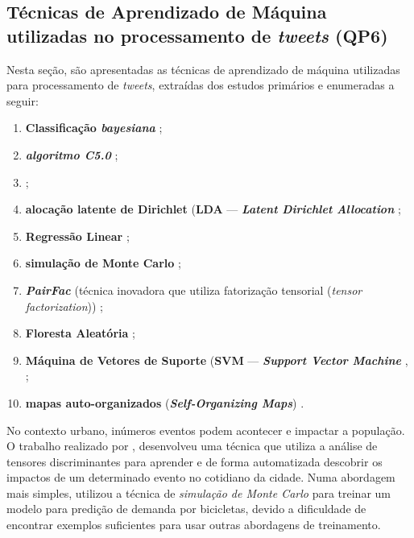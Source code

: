 \documentclass[
	12pt,				%
	oneside,			%
	a4paper,			%
	english,			%
	brazil				%
	]{abntex2ppgsi}
\begin{document}
{{{\begin{enumerate}
\end{enumerate}

\subsection{Técnicas de Aprendizado de Máquina utilizadas no processamento de \textit{tweets} (QP6)}
\label{iaClassification}
Nesta seção, são apresentadas as técnicas de aprendizado de máquina utilizadas para processamento de \textit{tweets}, extraídas dos estudos primários e enumeradas a seguir:

\begin{enumerate}
\item \textbf{Classificação \textit{bayesiana}} \cite{Mata2015};
\item \textit{\textbf{algoritmo C5.0}} \cite{Zagal2016};
\item {} \cite{Anantharam2015};
\item {} \textbf{alocação latente de Dirichlet}  {(\textbf{LDA} --- \textbf{\textit{Latent Dirichlet Allocation}}} \cite{Farseev2015, Abbasi2015, Hasan2014, DiLorenzo2013, Ni2016};
\item \textbf{Regressão Linear} \cite{Gutev2016, Bendler2014, Ni2016, Guo2016};
\item \textbf{simulação de Monte Carlo} \cite{Chen2016};
\item \textbf{\textit{PairFac}} (técnica inovadora que utiliza fatorização tensorial (\textit{tensor factorization})) \cite{Wen2016};
\item \textbf{Floresta Aleatória} \cite{Farseev2015};
\item {} {\textbf{Máquina de Vetores de Suporte} (\textbf{SVM} --- \textit{\textbf{Support Vector Machine}}} \cite{Mukherjee2015}, \cite{Gal-Tzur2014};
\item \textbf{mapas auto-organizados} (\textit{\textbf{Self-Organizing Maps}}) \cite{Frias-Martinez2014}.
\end{enumerate}

No contexto urbano, inúmeros eventos podem acontecer e impactar a população. O trabalho realizado por \cite{Wen2016}, desenvolveu uma técnica que utiliza a análise de tensores discriminantes para aprender e de forma automatizada descobrir os impactos de um determinado evento no cotidiano da cidade. Numa abordagem mais simples, \cite{Chen2016} utilizou a técnica de \textit{simulação de Monte Carlo} para treinar um modelo para predição de demanda por bicicletas, devido a dificuldade de encontrar exemplos suficientes para usar outras abordagens de treinamento. 

}}}
\end{document}
